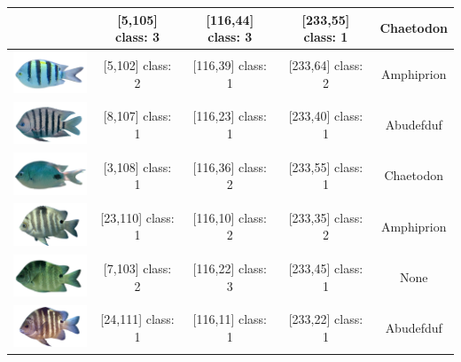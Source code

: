 \begin{longtable}{|c|c|c|c|c|}
	& [5,105] class: 3 & [116,44] class: 3 & [233,55] class: 1 & Chaetodon \\
	\hline
	\includegraphics[width=3cm]{gambar/dataset_validasi/Abudefduf05}
	& [5,102] class: 2 & [116,39] class: 1 & [233,64] class: 2 & Amphiprion \\
	\hline
	\includegraphics[width=3cm]{gambar/dataset_validasi/Abudefduf06}
	& [8,107] class: 1 & [116,23] class: 1 & [233,40] class: 1 & Abudefduf \\
	\hline
	\includegraphics[width=3cm]{gambar/dataset_validasi/Abudefduf07}
	& [3,108] class: 1 & [116,36] class: 2 & [233,55] class: 1 & Chaetodon \\
	\hline
	\includegraphics[width=3cm]{gambar/dataset_validasi/Abudefduf08}
	& [23,110] class: 1 & [116,10] class: 2 & [233,35] class: 2 & Amphiprion \\
	\hline
	\includegraphics[width=3cm]{gambar/dataset_validasi/Abudefduf09}
	& [7,103] class: 2 & [116,22] class: 3 & [233,45] class: 1 & None \\
	\hline
	\includegraphics[width=3cm]{gambar/dataset_validasi/Abudefduf10}
	& [24,111] class: 1 & [116,11] class: 1 & [233,22] class: 1 & Abudefduf \\

\end{longtable}
